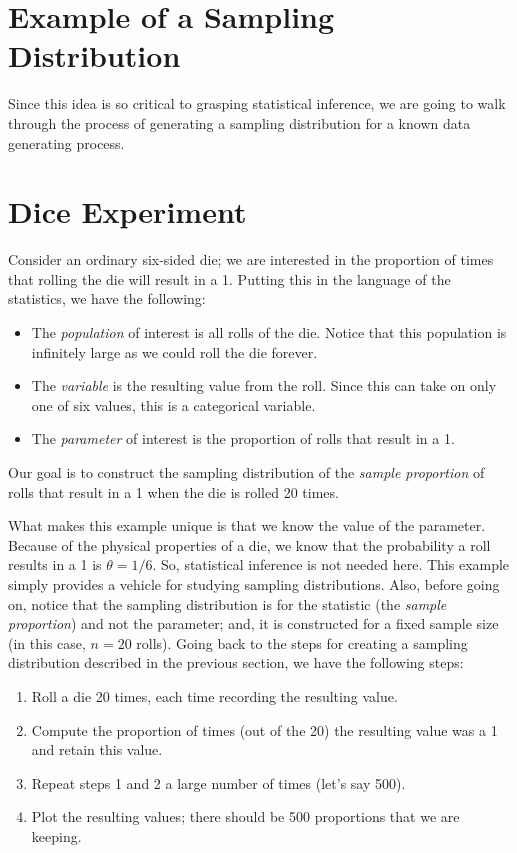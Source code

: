 \documentclass[
  letterpaper,
  DIV=11,
  numbers=noendperiod]{scrreprt}
\providecommand{\tightlist}{%
  \setlength{\itemsep}{0pt}\setlength{\parskip}{0pt}}\usepackage{longtable,booktabs,array}
\theoremstyle{plain}
\theoremstyle{definition}
\theoremstyle{definition}
\theoremstyle{remark}
\begin{document}
\section{Example of a Sampling
Distribution}\label{example-of-a-sampling-distribution}

Since this idea is so critical to grasping statistical inference, we are
going to walk through the process of generating a sampling distribution
for a known data generating process.

\label{ex-samplingdistns-dice}
\section{Dice Experiment}\label{dice-experiment}

Consider an ordinary six-sided die; we are interested in the proportion
of times that rolling the die will result in a 1. Putting this in the
language of the statistics, we have the following:

\begin{itemize}
\tightlist
\item
  The \emph{population} of interest is all rolls of the die. Notice that
  this population is infinitely large as we could roll the die forever.
\item
  The \emph{variable} is the resulting value from the roll. Since this
  can take on only one of six values, this is a categorical variable.
\item
  The \emph{parameter} of interest is the proportion of rolls that
  result in a 1.
\end{itemize}

Our goal is to construct the sampling distribution of the \emph{sample
proportion} of rolls that result in a 1 when the die is rolled 20 times.

What makes this example unique is that we know the value of the
parameter. Because of the physical properties of a die, we know that the
probability a roll results in a 1 is \(\theta = 1/6\). So, statistical
inference is not needed here. This example simply provides a vehicle for
studying sampling distributions. Also, before going on, notice that the
sampling distribution is for the statistic (the \emph{sample
proportion}) and not the parameter; and, it is constructed for a fixed
sample size (in this case, \(n = 20\) rolls). Going back to the steps
for creating a sampling distribution described in the previous section,
we have the following steps:

\begin{enumerate}
\def\labelenumi{\arabic{enumi}.}
\tightlist
\item
  Roll a die 20 times, each time recording the resulting value.
\item
  Compute the proportion of times (out of the 20) the resulting value
  was a 1 and retain this value.
\item
  Repeat steps 1 and 2 a large number of times (let's say 500).
\item
  Plot the resulting values; there should be 500 proportions that we are
  keeping.
\end{enumerate}
\end{document}
